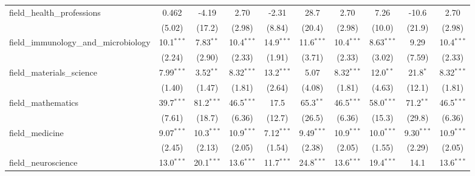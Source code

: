 \begin{tabular}{lccccccccc}
   field\_health\_professions                                  & 0.462         & -4.19         & 2.70          & -2.31        & 28.7         & 2.70          & 7.26           & -10.6          & 2.70\\   
                                                               & (5.02)        & (17.2)        & (2.98)        & (8.84)       & (20.4)       & (2.98)        & (10.0)         & (21.9)         & (2.98)\\   
   field\_immunology\_and\_microbiology                        & 10.1$^{***}$  & 7.83$^{**}$   & 10.4$^{***}$  & 14.9$^{***}$ & 11.6$^{***}$ & 10.4$^{***}$  & 8.63$^{***}$   & 9.29           & 10.4$^{***}$\\   
                                                               & (2.24)        & (2.90)        & (2.33)        & (1.91)       & (3.71)       & (2.33)        & (3.02)         & (7.59)         & (2.33)\\   
   field\_materials\_science                                   & 7.99$^{***}$  & 3.52$^{**}$   & 8.32$^{***}$  & 13.2$^{***}$ & 5.07         & 8.32$^{***}$  & 12.0$^{**}$    & 21.8$^{*}$     & 8.32$^{***}$\\   
                                                               & (1.40)        & (1.47)        & (1.81)        & (2.64)       & (4.08)       & (1.81)        & (4.63)         & (12.1)         & (1.81)\\   
   field\_mathematics                                          & 39.7$^{***}$  & 81.2$^{***}$  & 46.5$^{***}$  & 17.5         & 65.3$^{**}$  & 46.5$^{***}$  & 58.0$^{***}$   & 71.2$^{**}$    & 46.5$^{***}$\\   
                                                               & (7.61)        & (18.7)        & (6.36)        & (12.7)       & (26.5)       & (6.36)        & (15.3)         & (29.8)         & (6.36)\\   
   field\_medicine                                             & 9.07$^{***}$  & 10.3$^{***}$  & 10.9$^{***}$  & 7.12$^{***}$ & 9.49$^{***}$ & 10.9$^{***}$  & 10.0$^{***}$   & 9.30$^{***}$   & 10.9$^{***}$\\   
                                                               & (2.45)        & (2.13)        & (2.05)        & (1.54)       & (2.38)       & (2.05)        & (1.55)         & (2.29)         & (2.05)\\   
   field\_neuroscience                                         & 13.0$^{***}$  & 20.1$^{***}$  & 13.6$^{***}$  & 11.7$^{***}$ & 24.8$^{***}$ & 13.6$^{***}$  & 19.4$^{***}$   & 14.1           & 13.6$^{***}$\\   

\end{tabular}
